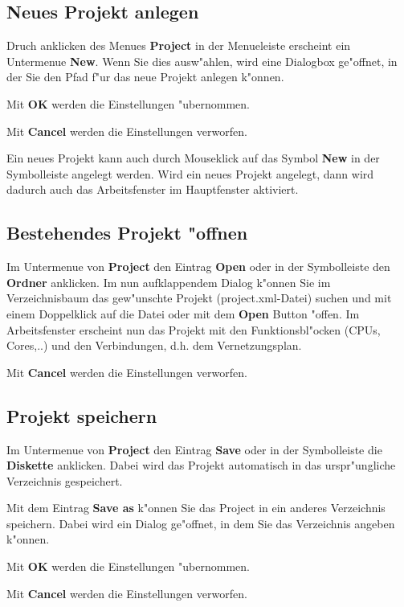 \documentclass[a4paper,titlepage,12pt,ngerman]{scrbook}
\begin{document}
\subsection{Neues Projekt anlegen}
Druch anklicken des Menues {\bf Project} in der Menueleiste erscheint ein Untermenue {\bf New}. Wenn Sie dies ausw"ahlen, wird eine Dialogbox ge"offnet, in der Sie den Pfad f"ur das neue Projekt anlegen k"onnen.\par
Mit {\bf OK} werden die Einstellungen "ubernommen.\par
Mit {\bf Cancel} werden die Einstellungen verworfen.\par
Ein neues Projekt kann auch durch Mouseklick auf das Symbol {\bf New} in der Symbolleiste angelegt werden.
Wird ein neues Projekt angelegt, dann wird dadurch auch das Arbeitsfenster im Hauptfenster aktiviert.

\subsection{Bestehendes Projekt "offnen}
Im Untermenue von {\bf Project} den Eintrag {\bf Open} oder in der Symbolleiste den {\bf Ordner} anklicken. Im nun aufklappendem Dialog k"onnen Sie im Verzeichnisbaum das gew"unschte Projekt (project.xml-Datei) suchen und mit einem Doppelklick auf die Datei oder mit dem {\bf Open} Button "offen.
Im Arbeitsfenster erscheint nun das Projekt mit den Funktionsbl"ocken (CPUs, Cores,..) und den Verbindungen, d.h. dem Vernetzungsplan.\par
Mit {\bf Cancel} werden die Einstellungen verworfen.\par

\subsection{Projekt speichern}
Im Untermenue von {\bf Project} den Eintrag {\bf Save} oder in der Symbolleiste die {\bf Diskette} anklicken. Dabei wird das Projekt automatisch in das urspr"ungliche Verzeichnis gespeichert.\par
Mit dem Eintrag {\bf Save as} k"onnen Sie das Project in ein anderes Verzeichnis speichern. Dabei wird ein Dialog ge"offnet, in dem Sie das Verzeichnis angeben k"onnen.\par
Mit {\bf OK} werden die Einstellungen "ubernommen.\par
Mit {\bf Cancel} werden die Einstellungen verworfen.\par

\end{document}
